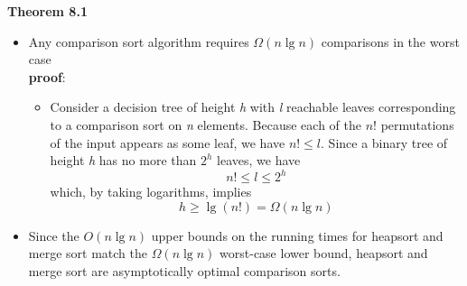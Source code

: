 \documentclass{report}
\begin{document}
\textbf{Theorem 8.1}
\begin{itemize}
    \item Any comparison sort algorithm requires $\Omega(n \lg n)$ comparisons in the worst case \\
    \textbf{proof}:
    \begin{itemize}
        \item Consider a decision tree of height \textit{h} with \textit{l} reachable leaves corresponding to a comparison sort on \textit{n} elements. Because each of the $n!$ permutations of the input appears as some leaf, we have $n! \leq l$. Since a binary tree of height \textit{h} has no more than $2^h$ leaves, we have
        $$n! \leq l \leq 2^h$$
        which, by taking logarithms, implies
        $$h \geq \lg(n!) = \Omega(n \lg n)$$
    \end{itemize}
    \item Since the $O(n \lg n)$ upper bounds on the running times for heapsort and merge sort match the $\Omega(n \lg n)$ worst-case lower bound, heapsort and merge sort are asymptotically optimal comparison sorts.
\end{itemize}
\end{document}
